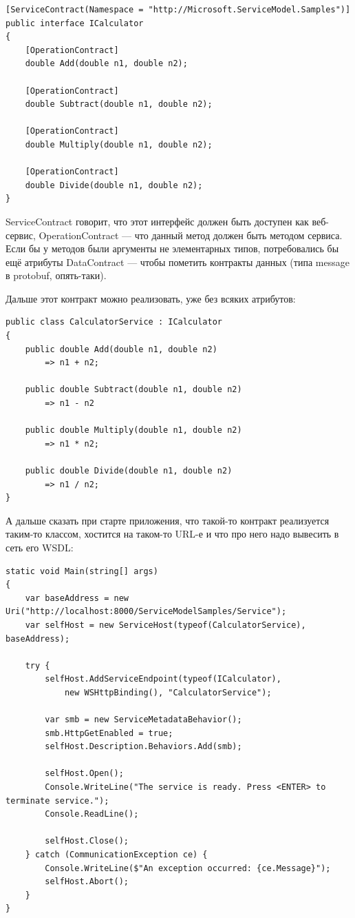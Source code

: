 \documentclass{../../text-style}
\begin{document}
\begin{verbatim}
[ServiceContract(Namespace = "http://Microsoft.ServiceModel.Samples")]  
public interface ICalculator  
{
    [OperationContract]
    double Add(double n1, double n2);

    [OperationContract]
    double Subtract(double n1, double n2);

    [OperationContract]
    double Multiply(double n1, double n2);

    [OperationContract]
    double Divide(double n1, double n2);
}
\end{verbatim}

ServiceContract говорит, что этот интерфейс должен быть доступен как веб-сервис, OperationContract --- что данный метод должен быть методом сервиса. Если бы у методов были аргументы не элементарных типов, потребовались бы ещё атрибуты DataContract --- чтобы пометить контракты данных (типа message в protobuf, опять-таки).

Дальше этот контракт можно реализовать, уже без всяких атрибутов:

\begin{verbatim}
public class CalculatorService : ICalculator  
{
    public double Add(double n1, double n2)
        => n1 + n2;  

    public double Subtract(double n1, double n2)
        => n1 - n2

    public double Multiply(double n1, double n2)  
        => n1 * n2;

    public double Divide(double n1, double n2)  
        => n1 / n2;
}
\end{verbatim}

А дальше сказать при старте приложения, что такой-то контракт реализуется таким-то классом, хостится на таком-то URL-е и что про него надо вывесить в сеть его WSDL:

\begin{verbatim}
static void Main(string[] args) 
{
    var baseAddress = new Uri("http://localhost:8000/ServiceModelSamples/Service");
    var selfHost = new ServiceHost(typeof(CalculatorService), baseAddress);

    try {
        selfHost.AddServiceEndpoint(typeof(ICalculator), 
            new WSHttpBinding(), "CalculatorService");

        var smb = new ServiceMetadataBehavior();
        smb.HttpGetEnabled = true;
        selfHost.Description.Behaviors.Add(smb);

        selfHost.Open();
        Console.WriteLine("The service is ready. Press <ENTER> to terminate service.");
        Console.ReadLine();

        selfHost.Close();  
    } catch (CommunicationException ce) {
        Console.WriteLine($"An exception occurred: {ce.Message}");
        selfHost.Abort();
    }
}
\end{verbatim}
\end{document}
